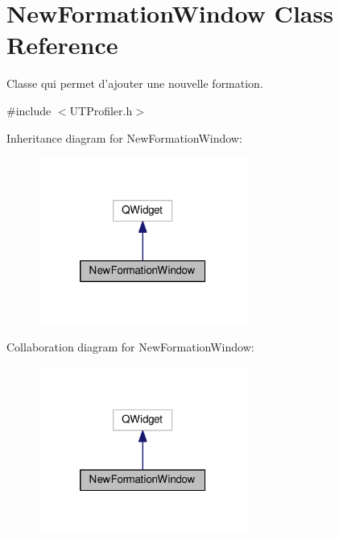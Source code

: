 \hypertarget{class_new_formation_window}{\section{New\-Formation\-Window Class Reference}
\label{class_new_formation_window}
}


Classe qui permet d'ajouter une nouvelle formation.  




{\ttfamily \#include $<$U\-T\-Profiler.\-h$>$}



Inheritance diagram for New\-Formation\-Window\-:
\nopagebreak
\begin{figure}[H]
\begin{center}
\leavevmode
\includegraphics[width=194pt]{class_new_formation_window__inherit__graph}
\end{center}
\end{figure}


Collaboration diagram for New\-Formation\-Window\-:
\nopagebreak
\begin{figure}[H]
\begin{center}
\leavevmode
\includegraphics[width=194pt]{class_new_formation_window__coll__graph}
\end{center}
\end{figure}
